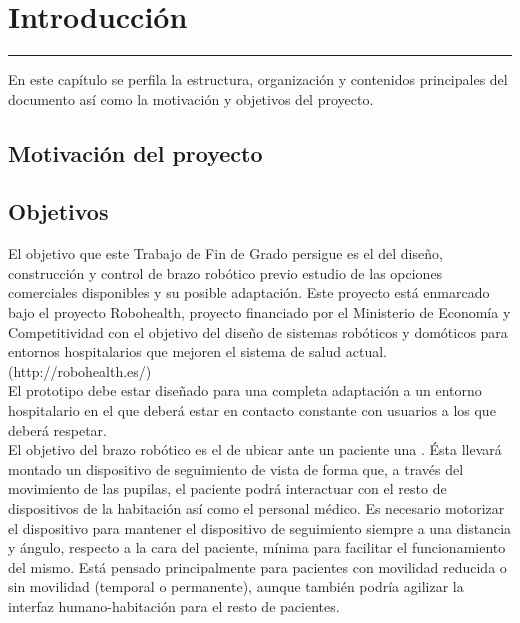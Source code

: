 \chapter{Introducción} \label{chap:Introduccion}
\hrule
\vspace{3mm}

En este capítulo se perfila la estructura, organización y contenidos principales del documento así como la motivación y objetivos del proyecto.


\section{Motivación del proyecto}



\section{Objetivos}

El objetivo que este Trabajo de Fin de Grado persigue es el del diseño, construcción y control de brazo robótico previo estudio de las opciones comerciales disponibles y su posible adaptación. Este proyecto está enmarcado bajo el proyecto Robohealth, proyecto financiado por el Ministerio de Economía y Competitividad con el objetivo del diseño de sistemas robóticos y domóticos para entornos hospitalarios que mejoren el sistema de salud actual. (\completar http://robohealth.es/)
\\

El  prototipo debe estar diseñado para una completa adaptación a un entorno hospitalario en el que deberá estar en contacto constante con usuarios a los que deberá respetar.
\\

El objetivo del brazo robótico es el de ubicar ante un paciente una . Ésta llevará montado un dispositivo de seguimiento de vista de forma que, a través del movimiento de las pupilas, el paciente podrá interactuar con el resto de dispositivos de la habitación así como el personal médico. Es necesario motorizar el dispositivo para mantener el dispositivo de seguimiento siempre a una distancia y ángulo, respecto a la cara del paciente, mínima para facilitar el funcionamiento del mismo. Está pensado principalmente para pacientes con movilidad reducida o sin movilidad (temporal o permanente), aunque también podría agilizar la interfaz humano-habitación para el resto de pacientes.
\\

